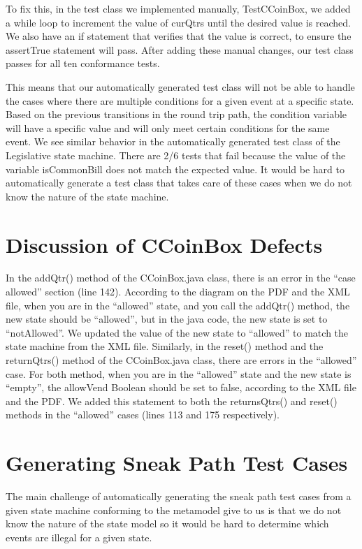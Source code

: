 \documentclass[11pt, a4paper]{article}
\begin{document}
To fix this, in the test class we implemented manually, TestCCoinBox, we added a while loop to increment the value of curQtrs until the desired value is reached. We also have an if statement that verifies that the value is correct, to ensure the assertTrue statement will pass. After adding these manual changes, our test class passes for all ten conformance tests. 

This means that our automatically generated test class will not be able to handle the cases where there are multiple conditions for a given event at a specific state. Based on the previous transitions in the round trip path, the condition variable will have a specific value and will only meet certain conditions for the same event. We see similar behavior in the automatically generated test class of the Legislative state machine. There are 2/6 tests that fail because the value of the variable isCommonBill does not match the expected value. It would be hard to automatically generate a test class that takes care of these cases when we do not know the nature of the state machine.    

\section{Discussion of CCoinBox Defects}
In the addQtr() method of the CCoinBox.java class, there is an error in the “case allowed” section (line 142). According to the diagram on the PDF and the XML file, when you are in the “allowed” state, and you call the addQtr() method, the new state should be “allowed”, but in the java code, the new state is set to “notAllowed”. We updated the value of the new state to “allowed” to match the state machine from the XML file. Similarly, in the reset() method and the returnQtrs() method of the CCoinBox.java class, there are errors in the “allowed” case. For both method, when you are in the “allowed” state and the new state is “empty”, the allowVend Boolean should be set to false, according to the XML file and the PDF. We added this statement to both the returnsQtrs() and reset() methods in the “allowed” cases (lines 113 and 175 respectively). 

\section{Generating Sneak Path Test Cases}
The main challenge of automatically generating the sneak path test cases from a given state machine conforming to the metamodel give to us is that we do not know the nature of the state model so it would be hard to determine which events are illegal for a given state. 
\end{document}
